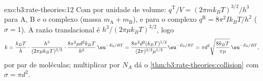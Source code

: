 \begin{solution}{exo:b3:rate-theories:12}
Com  por unidade de volume: $q^{\mathrm T}/V = (2\pi mk_BT)^{3/2}/h^3$ para
A, B e o complexo (massa $m_{\mathrm A} + m_{\mathrm B}$), e para o complexo $q^{\mathrm R} = 8\pi^2Ik_BT/h^2$
($\sigma = 1$). A razão translacional é $h^3/(2\pi\mu k_BT)^{3/2}$, logo
\[
  k = \frac{k_BT}{h}\cdot\frac{h^3}{(2\pi\mu k_BT)^{3/2}}\cdot\frac{8\pi^2\mu d^2k_BT}{h^2}\,\eu^{-E_0/RT}
    = \frac{8\pi^2d^2(k_BT)^{1/2}}{(2\pi)^{3/2}\mu^{1/2}}\eu^{-E_0/RT}
    = \pi d^2\sqrt{\frac{8k_BT}{\pi\mu}}\,\eu^{-E_0/RT},
\]
por par de moléculas; multiplicar por $N_A$ dá o \cref{thm:b3:rate-theories:collision}
com $\sigma = \pi d^2$.
\end{solution}

